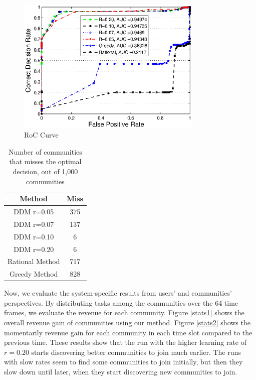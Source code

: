 {\begin{figure}%
\centering
\includegraphics[width=3.5in]{figures/roc.eps}
\caption{RoC Curve}
\label{roc5}
\end{figure}

\begin{table}[ht]
\caption{Number of communities that misses the optimal decision, out of 1,000 communities} %
\centering %
\begin{tabular}{|c|c|} %
\hline %
 Method&Miss \\ [0.5ex] %
\hline %
 DDM r=0.05& 375 \\ %
 DDM r=0.07& 137 \\
 DDM r=0.10& 6 \\
 DDM r=0.20& 6 \\
Rational Method& 717 \\
Greedy Method& 828 \\ [1ex] %
\hline %
\end{tabular}
\label{fail_rate} %
\end{table}


Now, we evaluate the system-specific results from users' and communities' perspectives. By distributing tasks among the communities over the 64 time frames, we evaluate the revenue for each community. Figure \ref{stats1} shows the overall revenue gain of communities using our method. Figure \ref{stats2} shows the momentarily revenue gain for each community in each time slot compared to the previous time. These results show that the run with the higher learning rate of $r=0.20$ starts discovering better communities to join much earlier. The runs with slow rates seem to find some communities to join initially, but then they slow down until later, when they start discovering new communities to join.


}
